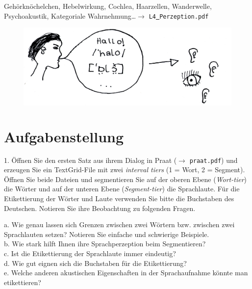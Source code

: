 \documentclass[11pt]{book}
\begin{document}
Gehörknöchelchen, Hebelwirkung, Cochlea, Haarzellen, Wanderwelle, Psychoakustik, Kategoriale Wahrnehmung\dots $\rightarrow$ {\tt L4\underline{\ }Perzeption.pdf}

\begin{figure}[htbp]
\begin{center}
\includegraphics[width=\textwidth]{grafiken/annotationstypen/annotationstypen}
\label{t3}
\end{center}
\end{figure}
\section{Aufgabenstellung}
 
1.	Öffnen Sie den ersten Satz aus ihrem Dialog in Praat ($\rightarrow$ {\tt praat.pdf}) und erzeugen Sie ein TextGrid-File mit zwei \emph{interval tiers} (1 = Wort, 2 = Segment). Öffnen Sie beide Dateien und segmentieren Sie auf der oberen Ebene (\emph{Wort-tier}) die Wörter und auf der unteren Ebene (\emph{Segment-tier}) die Sprachlaute. Für die Etikettierung der Wörter und Laute verwenden Sie bitte die Buchstaben des Deutschen. Notieren Sie ihre Beobachtung zu folgenden Fragen.\\
\newline

a.	Wie genau lassen sich Grenzen zwischen zwei Wörtern bzw. zwischen zwei Sprachlauten setzen? Notieren Sie einfache und schwierige Beispiele. \vspace{5cm}\\
b.	Wie stark hilft Ihnen ihre Sprachperzeption beim Segmentieren? \vspace{5cm}\\
\newpage
c.	Ist die Etikettierung der Sprachlaute immer eindeutig? \vspace{5cm}\\
d.	Wie gut eignen sich die Buchstaben für die Etikettierung? \vspace{5cm}\\
e.	Welche anderen akustischen Eigenschaften in der Sprachaufnahme könnte man etikettieren? \vspace*{5cm}\\
\newpage
\end{document}
